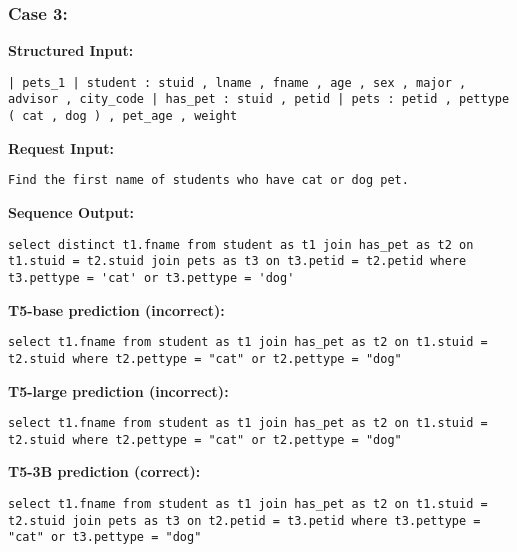 \documentclass[11pt]{article}
\begin{document}
\subsubsection{Case 3:}
\textbf{Structured Input:} 
\begin{lstlisting}
| pets_1 | student : stuid , lname , fname , age , sex , major , advisor , city_code | has_pet : stuid , petid | pets : petid , pettype ( cat , dog ) , pet_age , weight
\end{lstlisting}
\textbf{Request Input:} 
\begin{lstlisting}
Find the first name of students who have cat or dog pet.
\end{lstlisting}
\textbf{Sequence Output:} 
\begin{lstlisting}
select distinct t1.fname from student as t1 join has_pet as t2 on t1.stuid = t2.stuid join pets as t3 on t3.petid = t2.petid where t3.pettype = 'cat' or t3.pettype = 'dog'
\end{lstlisting}
\textbf{T5-base prediction (incorrect):} 
\begin{lstlisting}
select t1.fname from student as t1 join has_pet as t2 on t1.stuid = t2.stuid where t2.pettype = "cat" or t2.pettype = "dog"
\end{lstlisting}
\textbf{T5-large prediction (incorrect):} 
\begin{lstlisting}
select t1.fname from student as t1 join has_pet as t2 on t1.stuid = t2.stuid where t2.pettype = "cat" or t2.pettype = "dog"
\end{lstlisting}
\textbf{T5-3B prediction (correct):} 
\begin{lstlisting}
select t1.fname from student as t1 join has_pet as t2 on t1.stuid = t2.stuid join pets as t3 on t2.petid = t3.petid where t3.pettype = "cat" or t3.pettype = "dog"
\end{lstlisting}
\end{document}
